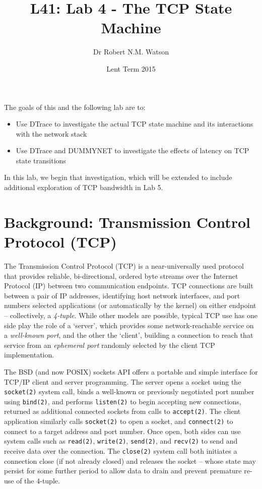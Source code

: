 \documentclass[a4paper,10pt]{article}
\begin{document}
\title{L41: Lab 4 - The TCP State Machine}
\author{Dr Robert N.M. Watson}
\date{Lent Term 2015}
\maketitle

\noindent
The goals of this and the following lab are to:

\begin{itemize}
\item Use DTrace to investigate the actual TCP state machine and its
  interactions with the network stack
\item Use DTrace and DUMMYNET to investigate the effects of latency on TCP
  state transitions
\end{itemize}

\noindent
In this lab, we begin that investigation, which will be extended to include
additional exploration of TCP bandwidth in Lab 5.

\section*{Background: Transmission Control Protocol (TCP)}

The Transmission Control Protocol (TCP) is a near-universally used protocol
that provides reliable, bi-directional, ordered byte streams over the Internet
Protocol (IP) between two communication endpoints.
TCP connections are built between a pair of IP addresses, identifying host
network interfaces, and port numbers selected applications (or automatically
by the kernel) on either endpoint -- collectively, a \textit{4-tuple}.
While other models are possible, typical TCP use has one side play the role of
a `server', which provides some network-reachable service on a
\textit{well-known port}, and the other the `client', building a connection to
reach that service from an \textit{ephemeral port} randomly selected by the
client TCP implementation.

The BSD (and now POSIX) sockets API offers a portable and simple interface for
TCP/IP client and server programming.
The server opens a socket using the \texttt{socket(2)} system call, binds a
well-known or previously negotiated port number using \texttt{bind(2)}, and
performs \texttt{listen(2)} to begin accepting new connections, returned as
additional connected sockets from calls to \texttt{accept(2)}.
The client application similarly calls \texttt{socket(2)} to open a socket,
and \texttt{connect(2)} to connect to a target address and port number.
Once open, both sides can use system calls such as \texttt{read(2)},
\texttt{write(2)}, \texttt{send(2)}, and \texttt{recv(2)} to send and receive
data over the connection.
The \texttt{close(2)} system call both initiates a connection close (if not
already closed) and releases the socket -- whose state may persist for some
further period to allow data to drain and prevent premature re-use of the
4-tuple.
\end{document}
